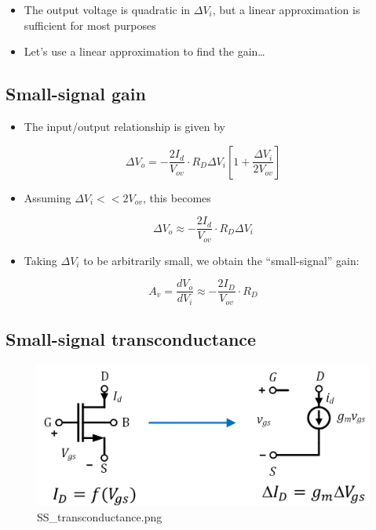 \documentclass[11pt]{article}
\providecommand{\tightlist}{%
      \setlength{\itemsep}{0pt}\setlength{\parskip}{0pt}}
\begin{document}
\begin{itemize}
\tightlist
\item
  The output voltage is quadratic in \(\Delta V_i\), but a linear
  approximation is sufficient for most purposes
\item
  Let's use a linear approximation to find the gain\ldots{}
\end{itemize}

    \hypertarget{small-signal-gain}{%
\subsection{Small-signal gain}\label{small-signal-gain}}

    \begin{itemize}
\tightlist
\item
  The input/output relationship is given by
\end{itemize}

\begin{equation}
\Delta V_o = -\dfrac{2I_d}{V_{ov}} \cdot R_D \Delta V_i \left[1 + \dfrac{\Delta V_i}{2V_{ov}} \right]
\end{equation}

\begin{itemize}
\tightlist
\item
  Assuming \(\Delta V_i << 2V_{ov}\), this becomes
\end{itemize}

\begin{equation}
\Delta V_o \approx -\dfrac{2I_d}{V_{ov}}\cdot R_D \Delta V_i
\end{equation}

\begin{itemize}
\tightlist
\item
  Taking \(\Delta V_i\) to be arbitrarily small, we obtain the
  ``small-signal'' gain:
\end{itemize}

\begin{equation}
A_v = \dfrac{dV_o}{dV_i} \approx -\dfrac{2I_D}{V_{ov}} \cdot R_D 
\end{equation}

    \hypertarget{small-signal-transconductance}{%
\subsection{Small-signal
transconductance}\label{small-signal-transconductance}}

    \begin{figure}
\centering
\includegraphics{SS_transconductance.png}
\caption{SS\_transconductance.png}
\end{figure}
\end{document}
